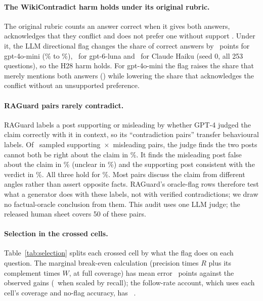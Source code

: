 \paragraph{The WikiContradict harm holds under its original rubric.} The original rubric counts an answer correct when it gives
both answers, acknowledges that they conflict and does not prefer one without support
\citep[\S3.4]{hou2024wikicontradict}. Under it, the LLM directional flag changes the share of correct answers
by \wikiOrigMiniEff\ points for gpt-4o-mini (\wikiOrigMiniPlain\% to \wikiOrigMiniDir\%), \wikiOrigLunaEff\ for
gpt-6-luna and \wikiOrigHaikuEff\ for Claude Haiku (seed 0, all 253 questions), so the H28 harm holds. For gpt-4o-mini the flag raises the share that merely mentions both answers (\wikiBothMiniEff) while
lowering the share that acknowledges the conflict without an unsupported preference.

\paragraph{RAGuard pairs rarely contradict.} RAGuard labels a post supporting or misleading by whether GPT-4 judged the claim correctly
with it in context, so its ``contradiction pairs'' transfer behavioural labels. Of \rgAudN\ sampled
supporting~$\times$~misleading pairs, the judge finds the two posts cannot both be right about the claim in
\rgAudContradict\%. It finds the misleading post false about the claim in \rgAudBFalse\% (unclear in
\rgAudBUnclear\%) and the supporting post consistent with the verdict in \rgAudASupports\%. All three hold for
\rgAudVerified\%. Most pairs discuss the claim from different angles rather than assert opposite
facts. RAGuard's oracle-flag rows therefore test what a generator does with these labels, not with verified
contradictions; we draw no factual-oracle conclusion from them. This audit uses one LLM judge; the released
human sheet covers 50 of these pairs.


\paragraph{Selection in the crossed cells.} Table~\ref{tab:selection} splits each crossed cell by what the flag does
on each question. The marginal break-even calculation (precision times $R$ plus its complement times $W$, at full
coverage) has mean error \selMargMae\ points against the observed gains (\selMargCovMae\ when scaled by recall); the
follow-rate account, which uses each cell's coverage and no-flag accuracy, has \predEightMae\ \predEightMaeCI.

